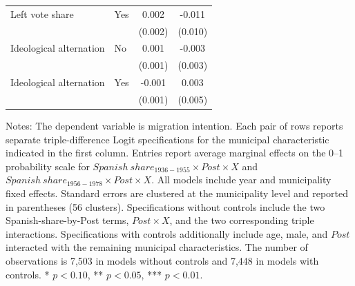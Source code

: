 \begin{table}[!htbp]
\begin{tabular}{llcc}
Left vote share & Yes & 0.002 & -0.011 \\
 & & (0.002) & (0.010) \\
\addlinespace
Ideological alternation & No & 0.001 & -0.003 \\
 & & (0.001) & (0.003) \\
Ideological alternation & Yes & -0.001 & 0.003 \\
 & & (0.001) & (0.005) \\
\hline
\end{tabular}
\par\vspace{1.5mm}
\begin{minipage}{\textwidth}
\footnotesize Notes: The dependent variable is migration intention. Each pair of rows reports separate triple-difference Logit specifications for the municipal characteristic indicated in the first column. Entries report average marginal effects on the 0--1 probability scale for \(Spanish\ share_{1936-1955} \times Post \times X\) and \(Spanish\ share_{1956-1978} \times Post \times X\). All models include year and municipality fixed effects. Standard errors are clustered at the municipality level and reported in parentheses (56 clusters). Specifications without controls include the two Spanish-share-by-Post terms, \(Post \times X\), and the two corresponding triple interactions. Specifications with controls additionally include age, male, and \(Post\) interacted with the remaining municipal characteristics. The number of observations is        7,503 in models without controls and        7,448 in models with controls. * \(p<0.10\), ** \(p<0.05\), *** \(p<0.01\).
\end{minipage}
\end{table}
